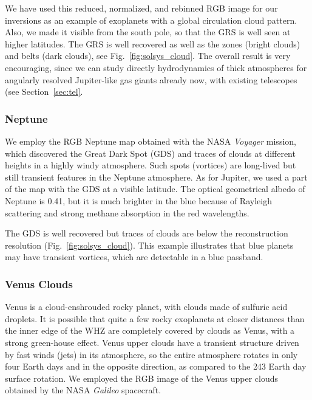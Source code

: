 \documentclass{emulateapj}
\begin{document}
We have used this reduced, normalized, and rebinned RGB image for our inversions
as an example of exoplanets with a global circulation cloud pattern.
Also, we made it visible from the south pole, so that the GRS is well seen at higher latitudes. 
The GRS is well recovered as well as the zones (bright clouds) and belts (dark clouds), see Fig.~\ref{fig:solsys_cloud}.
The overall result is very encouraging, since we can study directly hydrodynamics of thick
atmospheres for angularly resolved Jupiter-like gas giants already now, 
with existing telescopes (see Section~\ref{sec:tel}.

\subsubsection{Neptune}\label{sec:inve_solsys_clouds_nep}

We employ the RGB Neptune map obtained with the NASA {\em Voyager} mission, 
which discovered the Great Dark Spot (GDS)
and traces of clouds at different heights in a highly windy atmosphere. 
Such spots (vortices) are long-lived but still transient features 
in the Neptune atmosphere.
As for Jupiter, we used a part of the map with the GDS at a visible latitude.
The optical geometrical albedo of Neptune is 0.41, but it is much brighter in the blue
because of Rayleigh scattering and strong methane absorption in the red wavelengths.

The GDS is well recovered but traces of clouds are below the reconstruction resolution (Fig.~\ref{fig:solsys_cloud}).
This example illustrates that blue planets may have transient vortices, which are detectable in a blue passband.

\subsubsection{Venus Clouds}\label{sec:inve_solsys_clouds_ven}

Venus is a cloud-enshrouded rocky planet, with clouds made of sulfuric acid droplets.
It is possible that quite a few rocky exoplanets at closer distances than the inner edge of the WHZ
are completely covered by clouds as Venus, with a strong green-house effect. 
Venus upper clouds have a transient structure 
driven by fast winds (jets) in its atmosphere, so the entire atmosphere rotates
in only four Earth days and in the opposite direction, as compared to the 243 Earth day surface rotation. 
We employed the RGB image of the Venus upper clouds obtained by the NASA {\em Galileo} spacecraft. 
\end{document}
